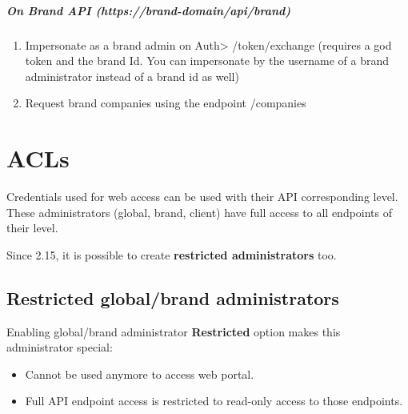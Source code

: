 \documentclass[letterpaper,10pt,english]{sphinxmanual}
\begin{document}
\paragraph{On Brand API (https://brand-domain/api/brand)}
\begin{enumerate}
\item {} 
Impersonate as a brand admin on Auth\textgreater{} /token/exchange (requires a god token and the brand Id. You can impersonate by the username of a brand administrator instead of a brand id as well)

\item {} 
Request brand companies using the endpoint /companies

\end{enumerate}


\chapter{ACLs}
\label{api_rest/acls:acls}\label{api_rest/acls::doc}\label{api_rest/acls:id1}
Credentials used for web access can be used with their API corresponding level. These administrators (global, brand, client)
have full access to all endpoints of their level.

Since 2.15, it is possible to create \textbf{restricted administrators} too.


\section{Restricted global/brand administrators}
\label{api_rest/acls:restricted-global-brand-administrators}
Enabling global/brand administrator \textbf{Restricted} option makes this administrator special:
\begin{itemize}
\item {} 
Cannot be used anymore to access web portal.

\item {} 
Full API endpoint access is restricted to read-only access to those endpoints.

\end{itemize}
\end{document}
